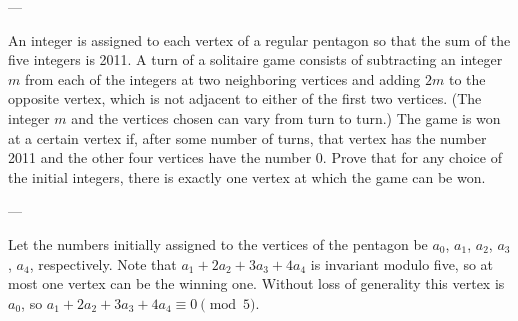 
---

An integer is assigned to each vertex of a regular pentagon so that the sum of the five integers is 2011. A turn of a solitaire game consists of subtracting an integer $m$ from each of the integers at two neighboring vertices and adding $2m$ to the opposite vertex, which is not adjacent to either of the first two vertices. (The integer $m$ and the vertices chosen can vary from turn to turn.) The game is won at a certain vertex if, after some number of turns, that vertex has the number 2011 and the other four vertices have the number 0. Prove that for any choice of the initial integers, there is exactly one vertex at which the game can be won.

---

Let the numbers initially assigned to the vertices of the pentagon be $a_0$, $a_1$, $a_2$, $a_3$, $a_4$, respectively. Note that $a_1+2a_2+3a_3+4a_4$ is invariant modulo five, so at most one vertex can be the winning one. Without loss of generality this vertex is $a_0$, so $a_1+2a_2+3a_3+4a_4\equiv0\pmod5$.

